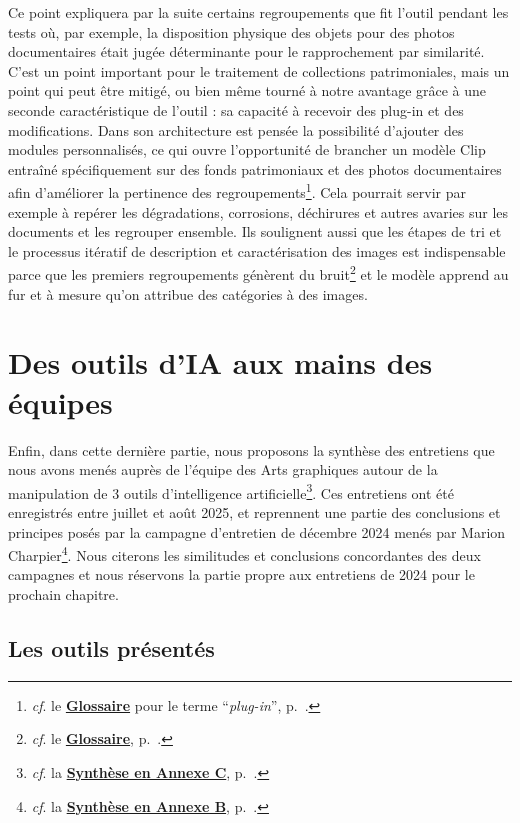 Ce point expliquera par la suite certains regroupements que fit l'outil pendant les tests où, par exemple, la disposition physique des objets pour des photos documentaires était jugée déterminante pour le rapprochement par similarité. C'est un point important pour le traitement de collections patrimoniales, mais un point qui peut être mitigé, ou bien même tourné à notre avantage grâce à une seconde caractéristique de l'outil : sa capacité à recevoir des plug-in et des modifications. Dans son architecture est pensée la possibilité d'ajouter des modules personnalisés, ce qui ouvre l'opportunité de brancher un modèle Clip entraîné spécifiquement sur des fonds patrimoniaux et des photos documentaires afin d'améliorer la pertinence des regroupements\footnote{\textit{cf}. le \textbf{\hyperref[sec:Glossaire]{Glossaire}} pour le terme \enquote{\textit{plug-in}}, p.~\pageref{sec:Glossaire}.}. Cela pourrait servir par exemple à repérer les dégradations, corrosions, déchirures et autres avaries sur les documents et les regrouper ensemble. Ils soulignent aussi que les étapes de tri et le processus itératif de description et caractérisation des images est indispensable parce que les premiers regroupements génèrent du bruit\footnote{\textit{cf}. le \textbf{\hyperref[sec:Glossaire]{Glossaire}}, p.~\pageref{sec:Glossaire}.} et le modèle apprend au fur et à mesure qu'on attribue des catégories à des images.

\section{Des outils d'IA aux mains des équipes}

Enfin, dans cette dernière partie, nous proposons la synthèse des entretiens que nous avons menés auprès de l'équipe des Arts graphiques autour de la manipulation de 3 outils d'intelligence artificielle\footnote{\textit{cf}. la \textbf{\hyperref[sec:Entretiens_2025]{Synthèse en Annexe C}}, p.~\pageref{sec:Entretiens_2025}.}. Ces entretiens ont été enregistrés entre juillet et août 2025, et reprennent une partie des conclusions et principes posés par la campagne d'entretien de décembre 2024 menés par Marion Charpier\footnote{\textit{cf}. la \textbf{\hyperref[sec:Entretiens_2024]{Synthèse en Annexe B}}, p.~\pageref{sec:Entretiens_2024}.}. Nous citerons les similitudes et conclusions concordantes des deux campagnes et nous réservons la partie propre aux entretiens de 2024 pour le prochain chapitre.

\subsection{Les outils présentés}

